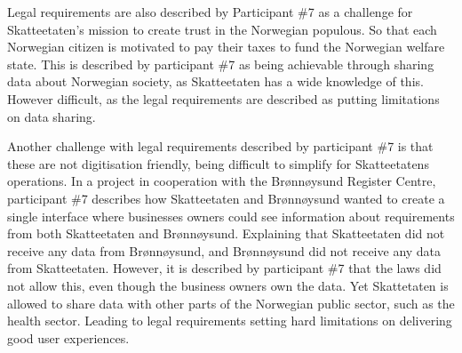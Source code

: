 
Legal requirements are also described by Participant \#7 as a challenge for Skatteetaten's mission to create trust in the Norwegian populous. So that each Norwegian citizen is motivated to pay their taxes to fund the Norwegian welfare state. This is described by participant \#7 as being achievable through sharing data about Norwegian society, as Skatteetaten has a wide knowledge of this. However difficult, as the legal requirements are described as putting limitations on data sharing.


Another challenge with legal requirements described by participant \#7 is that these are not digitisation friendly, being difficult to simplify for Skatteetatens operations. In a project in cooperation with the Brønnøysund Register Centre, participant \#7 describes how Skatteetaten and Brønnøysund wanted to create a single interface where businesses owners could see information about requirements from both Skatteetaten and Brønnøysund. Explaining that Skatteetaten did not receive any data from Brønnøysund, and Brønnøysund did not receive any data from Skatteetaten. However, it is described by participant \#7 that the laws did not allow this, even though the business owners own the data. Yet Skattetaten is allowed to share data with other parts of the Norwegian public sector, such as the health sector. Leading to legal requirements setting hard limitations on delivering good user experiences.


